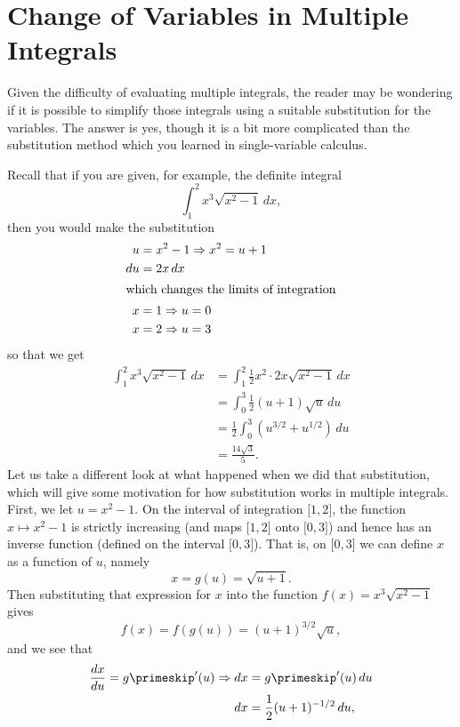 \section{Change of Variables in Multiple Integrals}\label{sec:jacobian}


Given the difficulty of evaluating multiple integrals, the reader may be wondering if it is possible to simplify those integrals using a suitable substitution for the variables. The answer is yes, though it is a bit more complicated than the substitution method which you learned in single-variable calculus.

Recall that if you are given, for example, the definite integral
\[\int_1^2 x^3 \sqrt{x^2 - 1}\,dx ,\]
then you would make the substitution
\begin{align*}
u &= x^2 - 1 \Rightarrow x^2 = u + 1\\
du &= 2x\,dx\\
\intertext{which changes the limits of integration}
x &= 1 \Rightarrow u = 0\\
x &= 2 \Rightarrow u = 3
\end{align*}
so that we get
\begin{align*}
 \int_1^2 x^3 \sqrt{x^2 - 1}\,dx &= \int_1^2 \frac12 x^2 \cdot 2x \sqrt{x^2 - 1}\,dx\\
 &= \int_0^3 \frac12 (u+1)\sqrt{u}\,du\\
 &= \frac12 \int_0^3 \left( u^{3/2} + u^{1/2} \right)\,du \\
 &= \frac{14\sqrt3}5 .
\end{align*}
Let us take a different look at what happened when we did that substitution, which will give some motivation for how substitution works in multiple integrals. First, we let $u = x^2 - 1$. On the interval of integration $\lbrack 1,2 \rbrack$, the function $x \mapsto x^2 - 1$ is strictly increasing (and maps $\lbrack 1,2 \rbrack$ onto $\lbrack 0,3 \rbrack$) and hence has an inverse function (defined on the interval $\lbrack 0,3 \rbrack$). That is, on $\lbrack 0,3 \rbrack$ we can define $x$ as a function of $u$, namely
\[x = g(u) = \sqrt{u+1} .\]
Then substituting that expression for $x$ into the function $f(x) = x^3 \sqrt{x^2 - 1}$ gives
\[f(x) = f(g(u)) = (u+1)^{3/2} \sqrt{u} ,\]
and we see that
\begin{align*}
 \frac{dx}{du} = g\primeskip'(u) \Rightarrow dx &= g\primeskip'(u)\,du\\
 dx &= \frac12 (u+1)^{-1/2}\,du ,
\end{align*}
